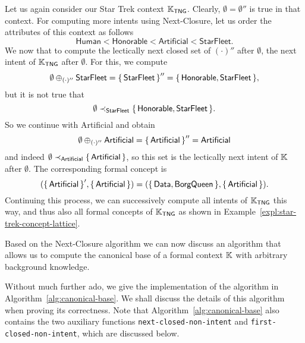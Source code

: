 \begin{Example}
  \label{expl:9}
  Let us again consider our Star Trek context ${\mathbb{K}}_{\mathsf{TNG}}$.  Clearly,
  $\emptyset = \emptyset''$ is true in that context.  For computing more intents using
  Next-Closure, let us order the attributes of this context as follows
  \begin{equation*}
    \mathsf{Human} < \mathsf{Honorable} < \mathsf{Artificial} < \mathsf{StarFleet}.
  \end{equation*}
  We now that to compute the lectically next closed set of $(\cdot)''$ after $\emptyset$,
  \ie the next intent of ${\mathbb{K}}_{\mathsf{TNG}}$ after $\emptyset$.  For this, we compute
  \begin{equation*}
    \emptyset \oplus_{(\cdot)''} \mathsf{StarFleet} = {\{\,\mathsf{StarFleet}\,\}}'' = {\{\,
      \mathsf{Honorable}, \mathsf{StarFleet} \,\}},
  \end{equation*}
  but it is not true that
  \begin{equation*}
    \emptyset \prec_{\mathsf{StarFleet}} {\{\, \mathsf{Honorable}, \mathsf{StarFleet} \,\}}.
  \end{equation*}
  So we continue with \textsf{Artificial} and obtain
  \begin{equation*}
    \emptyset \oplus_{(\cdot)''} \mathsf{Artificial} = {\{\, \mathsf{Artificial} \,\}}'' = \mathsf{Artificial}
  \end{equation*}
  and indeed $\emptyset \prec_{\mathsf{Artificial}} {\{\, \mathsf{Artificial} \,\}}$, so this
  set is the lectically next intent of ${\mathbb{K}}$ after $\emptyset$.  The corresponding
  formal concept is
  \begin{equation*}
    ({\{\, \mathsf{Artificial} \,\}}', {\{\, \mathsf{Artificial} \,\}}) = ({\{\, \mathsf{Data},
      \mathsf{BorgQueen} \,\}}, {\{\, \mathsf{Artificial} \,\}}).
  \end{equation*}
  Continuing this process, we can successively compute all intents of ${\mathbb{K}}_{\mathsf{TNG}}$ this way, and thus also all formal concepts of ${\mathbb{K}}_{\mathsf{TNG}}$
  as shown in Example~\ref{expl:star-trek-concept-lattice}.
\end{Example}

Based on the Next-Closure algorithm we can now discuss an algorithm that allows us to
compute the canonical base of a formal context ${\mathbb{K}}$ with arbitrary background
knowledge.


Without much further ado, we give the implementation of the algorithm in
Algorithm~\ref{alg:canonical-base}.  We shall discuss the details of this algorithm when
proving its correctness.  Note that Algorithm~\ref{alg:canonical-base} also contains the
two auxiliary functions \lstinline{next-closed-non-intent} and
\lstinline{first-closed-non-intent}, which are discussed below.

